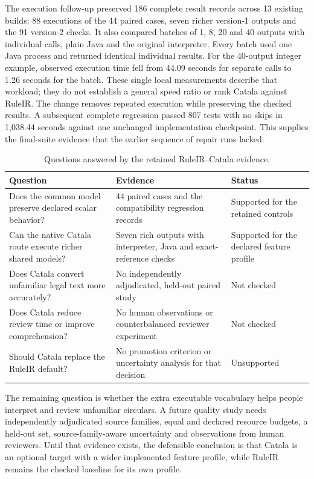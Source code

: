 The execution follow-up preserved 186 complete result records across 13 existing
builds: 88 executions of the 44 paired cases, seven richer version-1 outputs and
the 91 version-2 checks. It also compared batches of 1, 8, 20 and 40 outputs with
individual calls, plain Java and the original interpreter. Every batch used one
Java process and returned identical individual results. For the 40-output
integer example, observed execution time fell from 44.09 seconds for separate
calls to 1.26 seconds for the batch. These single local measurements describe
that workload; they do not establish a general speed ratio or rank Catala against
RuleIR. The change removes repeated execution while preserving the checked
results. A subsequent complete regression passed 807 tests with no skips in
1,038.44 seconds against one unchanged implementation checkpoint. This supplies
the final-suite evidence that the earlier sequence of repair runs lacked.

\begin{table}[H]
\centering
\caption{Questions answered by the retained RuleIR--Catala evidence.}
\label{tab:evaluation-catala-boundaries}
\begin{tabularx}{\textwidth}{P{45mm}YY}
\toprule
Question & Evidence & Status\\
\midrule
Does the common model preserve declared scalar behavior? & 44 paired cases and the compatibility regression records & Supported for the retained controls\\
\addlinespace[0.4em]
Can the native Catala route execute richer shared models? & Seven rich outputs with interpreter, Java and exact-reference checks & Supported for the declared feature profile\\
\addlinespace[0.4em]
Does Catala convert unfamiliar legal text more accurately? & No independently adjudicated, held-out paired study & Not checked\\
\addlinespace[0.4em]
Does Catala reduce review time or improve comprehension? & No human observations or counterbalanced reviewer experiment & Not checked\\
\addlinespace[0.4em]
Should Catala replace the RuleIR default? & No promotion criterion or uncertainty analysis for that decision & Unsupported\\
\bottomrule
\end{tabularx}
\end{table}

The remaining question is whether the extra executable vocabulary helps people
interpret and review unfamiliar circulars. A future quality study needs
independently adjudicated source families,
equal and declared resource budgets, a held-out set, source-family-aware
uncertainty and observations from human reviewers. Until that evidence exists, the defensible
conclusion is that Catala is an optional target with a wider implemented
feature profile, while RuleIR remains the checked baseline for its own profile.

